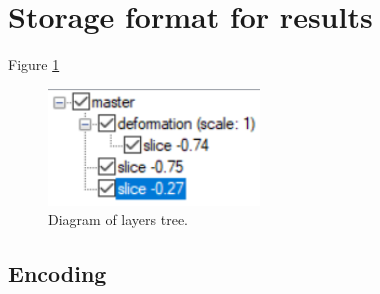 

\section{Storage format for results}
\label{sec:storage-format}



Figure \ref{fig:layers-tree}

\begin{figure}[H]
    \centering
    \includegraphics[width=0.5\textwidth]{figures/layers-tree-diagram}
    \decoRule
    \caption{Diagram of layers tree.}
    \label{fig:layers-tree}
\end{figure}






\subsection {Encoding}

